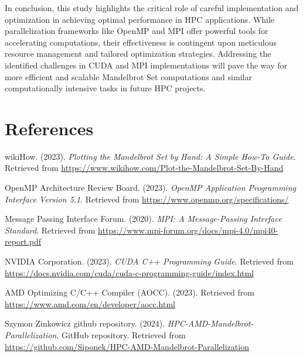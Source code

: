 \documentclass[
	report, %
	11pt, %
]{CSUniSchoolLabReport}
\newcounter{ct}
\begin{document}
In conclusion, this study highlights the critical role of careful implementation and optimization in achieving optimal performance in HPC applications. While parallelization frameworks like OpenMP and MPI offer powerful tools for accelerating computations, their effectiveness is contingent upon meticulous resource management and tailored optimization strategies. Addressing the identified challenges in CUDA and MPI implementations will pave the way for more efficient and scalable Mandelbrot Set computations and similar computationally intensive tasks in future HPC projects.

\section{References}

\begin{thebibliography}{9}
	wikiHow. (2023). \textit{Plotting the Mandelbrot Set by Hand: A Simple How-To Guide}. Retrieved from \url{https://www.wikihow.com/Plot-the-Mandelbrot-Set-By-Hand}

	OpenMP Architecture Review Board. (2023). \textit{OpenMP Application Programming Interface Version 5.1}. Retrieved from \url{https://www.openmp.org/specifications/}

	Message Passing Interface Forum. (2020). \textit{MPI: A Message-Passing Interface Standard}. Retrieved from \url{https://www.mpi-forum.org/docs/mpi-4.0/mpi40-report.pdf}

	NVIDIA Corporation. (2023). \textit{CUDA C++ Programming Guide}. Retrieved from \url{https://docs.nvidia.com/cuda/cuda-c-programming-guide/index.html}

	AMD Optimizing C/C++ Compiler (AOCC). (2023). Retrieved from \url{https://www.amd.com/en/developer/aocc.html}

	Szymon Zinkowicz github repository. (2024). \textit{HPC-AMD-Mandelbrot-Parallelization}. GitHub repository. Retrieved from \url{https://github.com/Siponek/HPC-AMD-Mandelbrot-Parallelization}


\end{thebibliography}
\end{document}
